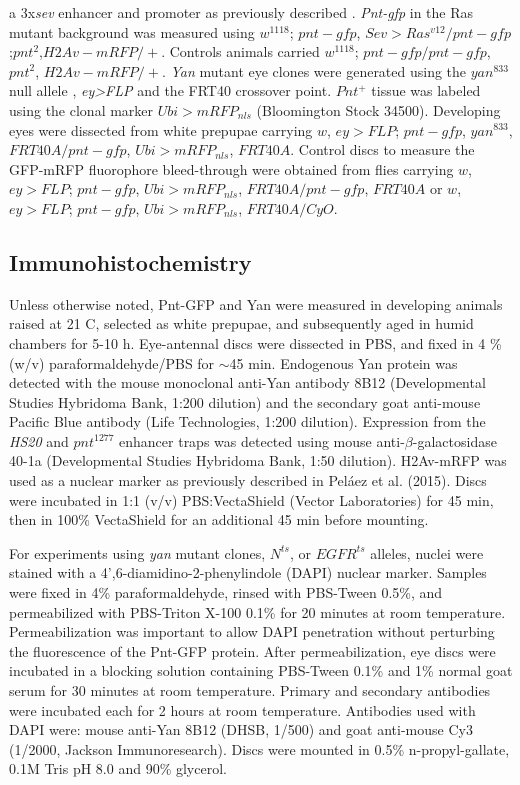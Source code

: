 a 3x\textit{sev} enhancer and promoter \cite{Fortini1992} as previously described \cite{Pelaez2015a}. \textit{Pnt-gfp} in the Ras mutant background was measured using $w^{1118}$; $pnt-gfp$, $Sev>Ras^{v12}/pnt-gfp$;$pnt^2$,$H2Av-mRFP/+$. Controls animals carried $w^{1118}$; $pnt-gfp/pnt-gfp$, $pnt^2$, $H2Av-mRFP/+$. \textit{Yan} mutant eye clones were generated using the $yan^{833}$ null allele \cite{Webber2013}, \textit{ey>FLP} and the FRT40 crossover point. $Pnt^+$ tissue was labeled using the clonal marker $Ubi>mRFP_{nls}$ (Bloomington Stock 34500). Developing eyes were dissected from white prepupae carrying $w$, $ey>FLP$; $pnt-gfp$, $yan^{833}$, $FRT40A/pnt-gfp$, $Ubi>mRFP_{nls}$, $FRT40A$. Control discs to measure the GFP-mRFP fluorophore bleed-through were obtained from flies carrying $w$, $ey>FLP$; $pnt-gfp$, $Ubi>mRFP_{nls}$, $FRT40A/pnt-gfp$, $FRT40A$ or $w$, $ey>FLP$; $pnt-gfp$, $Ubi>mRFP_{nls}$, $FRT40A/CyO$.

\subsection{Immunohistochemistry}
\label{appendix:methods:ratio:immunohistochemistry}

Unless otherwise noted, Pnt-GFP and Yan were measured in developing animals raised at 21 \textdegree{} C, selected as white prepupae, and subsequently aged in humid chambers for 5-10 h. Eye-antennal discs were dissected in PBS, and fixed in 4 \% (w/v) paraformaldehyde/PBS for $\sim$45 min. Endogenous Yan protein was detected with the mouse monoclonal anti-Yan antibody 8B12 (Developmental Studies Hybridoma Bank, 1:200 dilution) and the secondary goat anti-mouse Pacific Blue antibody (Life Technologies, 1:200 dilution). Expression from the \textit{HS20} and $pnt^{1277}$ enhancer traps was detected using mouse anti-$\beta$-galactosidase 40-1a (Developmental Studies Hybridoma Bank, 1:50 dilution). H2Av-mRFP was used as a nuclear marker as previously described in Pel\'{a}ez et al. (2015). Discs were incubated in 1:1 (v/v) PBS:VectaShield (Vector Laboratories) for 45 min, then in 100\% VectaShield for an additional 45 min before mounting.

For experiments using \textit{yan} mutant clones, $N^{ts}$, or $EGFR^{ts}$ alleles, nuclei were stained with a 4',6-diamidino-2-phenylindole (DAPI) nuclear marker. Samples were fixed in 4\% paraformaldehyde, rinsed with PBS-Tween 0.5\%, and permeabilized with PBS-Triton X-100 0.1\% for 20 minutes at room temperature. Permeabilization was important to allow DAPI penetration without perturbing the fluorescence of the Pnt-GFP protein. After permeabilization, eye discs were incubated in a blocking solution containing PBS-Tween 0.1\% and 1\% normal goat serum for 30 minutes at room temperature. Primary and secondary antibodies were incubated each for 2 hours at room temperature. Antibodies used with DAPI were: mouse anti-Yan 8B12 (DHSB, 1/500) and goat anti-mouse Cy3 (1/2000, Jackson Immunoresearch). Discs were mounted in 0.5\% n-propyl-gallate, 0.1M Tris pH 8.0 and 90\% glycerol.

